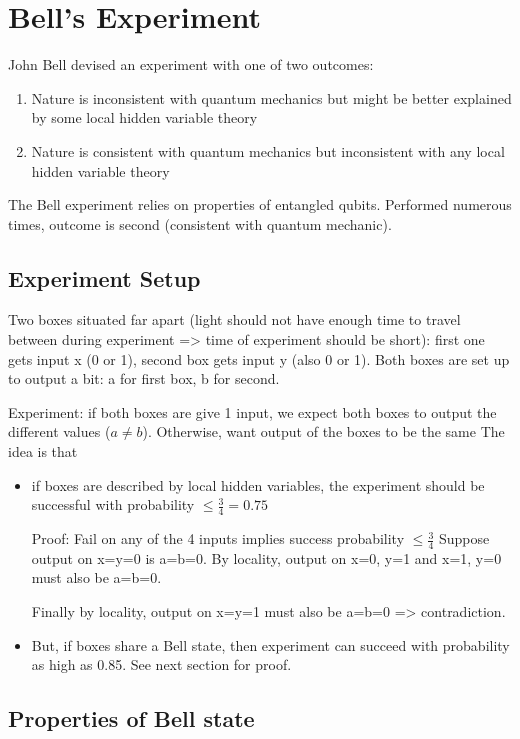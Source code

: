 \documentclass{scrartcl}
\begin{document}
\section{Bell's Experiment}
\label{sec:4}
John Bell devised an experiment with one of two outcomes:
\begin{enumerate}
\item Nature is inconsistent with quantum mechanics but might be better
  explained by some local hidden variable theory
\item Nature is consistent with quantum mechanics but inconsistent with any
  local hidden variable theory
\end{enumerate}
The Bell experiment relies on properties of entangled qubits. Performed numerous
times, outcome is second (consistent with quantum mechanic).
 
\subsection{Experiment Setup}
\label{sec:4-1}
Two boxes situated far apart (light should not have enough time to travel
between during experiment => time of experiment should be short): first one gets
input x (0 or 1), second box gets input y (also 0 or 1). Both boxes are set up
to output a bit: a for first box, b for second.

Experiment: if both boxes are give 1 input, we expect both boxes to output the
different values ($a \neq b$). Otherwise, want output of the boxes to be the
same The idea is that
\begin{itemize}
\item if boxes are described by local hidden variables, the experiment should be
  successful with probability $\leq \frac{3}{4} = 0.75$

  Proof: Fail on any of the 4 inputs implies success probability $\leq
  \frac{3}{4}$ Suppose output on x=y=0 is a=b=0. By locality, output on x=0, y=1
  and x=1, y=0 must also be a=b=0.

  Finally by locality, output on x=y=1 must also be a=b=0 => contradiction.

\item But, if boxes share a Bell state, then experiment can succeed with
  probability as high as 0.85. See next section for proof.
\end{itemize}

\subsection{Properties of Bell state}
\label{sec:4-2}
\end{document}
